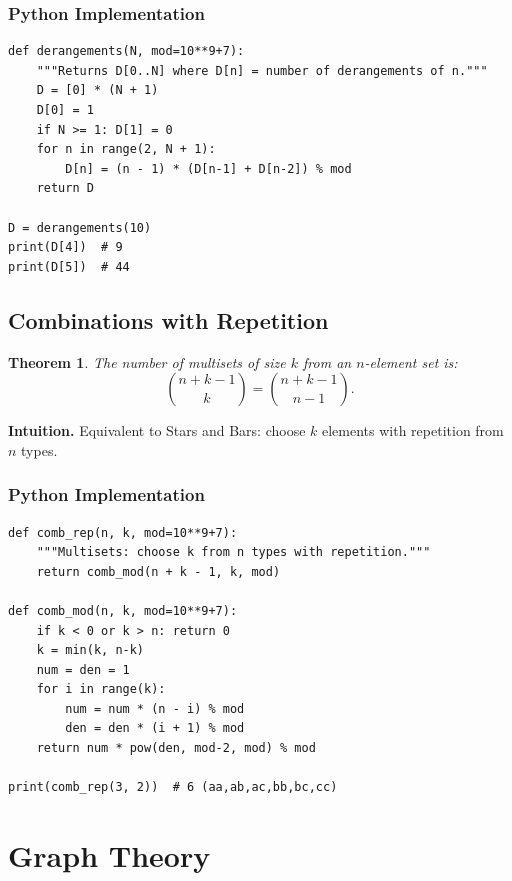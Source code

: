 \documentclass[10pt,a4paper]{article}
\theoremstyle{cpstyle}
\newtheorem{theorem}{Theorem}[section]
\begin{document}
\subsubsection{Python Implementation}
\begin{lstlisting}[caption={Derangements mod p}]
def derangements(N, mod=10**9+7):
    """Returns D[0..N] where D[n] = number of derangements of n."""
    D = [0] * (N + 1)
    D[0] = 1
    if N >= 1: D[1] = 0
    for n in range(2, N + 1):
        D[n] = (n - 1) * (D[n-1] + D[n-2]) % mod
    return D

D = derangements(10)
print(D[4])  # 9
print(D[5])  # 44
\end{lstlisting}

\subsection{Combinations with Repetition}

\begin{theorem}
The number of multisets of size $k$ from an $n$-element set is:
\[
  \binom{n+k-1}{k} = \binom{n+k-1}{n-1}.
\]
\end{theorem}

\textbf{Intuition.} Equivalent to Stars and Bars: choose $k$ elements with repetition from $n$ types.

\subsubsection{Python Implementation}
\begin{lstlisting}[caption={Combinations with repetition}]
def comb_rep(n, k, mod=10**9+7):
    """Multisets: choose k from n types with repetition."""
    return comb_mod(n + k - 1, k, mod)

def comb_mod(n, k, mod=10**9+7):
    if k < 0 or k > n: return 0
    k = min(k, n-k)
    num = den = 1
    for i in range(k):
        num = num * (n - i) % mod
        den = den * (i + 1) % mod
    return num * pow(den, mod-2, mod) % mod

print(comb_rep(3, 2))  # 6 (aa,ab,ac,bb,bc,cc)
\end{lstlisting}

\clearpage
\section{Graph Theory}
\end{document}
